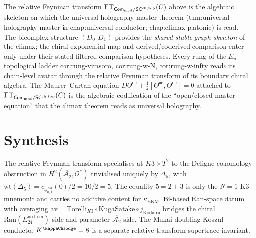 \begin{remark}%
\label{rem:anchor-relative-feynman}%
%
%
%
The relative Feynman transform $\mathrm{FT}_{\mathsf{Com}_{\mathrm{mod}} / \mathsf{SC}^{\mathrm{ch,top}}}(C)$ above is the
algebraic skeleton on which the universal-holography master
theorem (\textsf{thm:universal-holography-master} in
\textsf{chap:universal-conductor}; \textsf{chap:climax-platonic}) is
read. The bicomplex structure $(D_0, D_1)$ provides the
\emph{shared stable-graph skeleton} of the climax; the chiral
exponential map and derived/coderived comparison enter only under
their stated filtered comparison hypotheses. Every rung of the
$E_n$-topological ladder
\textsf{cor:rung-virasoro}, \textsf{cor:rung-w-N},
\textsf{cor:rung-w-infty} reads its chain-level avatar through the
relative Feynman transform of its boundary chiral algebra. The
Maurer--Cartan equation
$D \Theta^{\mathrm{oc}} + \tfrac12 [\Theta^{\mathrm{oc}},
 \Theta^{\mathrm{oc}}] = 0$
attached to $\mathrm{FT}_{\mathsf{Com}_{\mathrm{mod}} / \mathsf{SC}^{\mathrm{ch,top}}}(C)$ is the algebraic codification of the
``open/closed master equation'' that the climax theorem reads as
universal holography.
\end{remark}

\section{Synthesis}
\label{sec:rft-supplement}

\begin{remark}
\label{rem:rft-K3-paramodular}
The relative Feynman transform specialises at $K3 \times T^2$ to the Deligne-cohomology obstruction in $H^2(\overline{\mathcal{A}_2}, \mathcal{O}^*)$ trivialised uniquely by $\Delta_5$, with $\mathrm{wt}(\Delta_5)=c_{\phi_{0,1}^{K3}}(0)/2=10/2=5$. The equality $5=2+3$ is only the $N=1$ K3 mnemonic and carries no additive content for $\kappa_{\mathrm{BKM}}$. Bi-based Ran-space datum with averaging $\mathrm{av} = \mathrm{Torelli}_{K3} \circ \mathrm{KugaSatake} \circ j_{\mathrm{Kodaira}}$ bridges the chiral $\mathrm{Ran}(E^{\mathrm{nod,sm}}_{24})$ side and parameter $\overline{\mathcal{A}_2}$ side. The Mukai-doubling Koszul conductor $K^{\kappaChHodge} = 8$ is a separate relative-transform supertrace invariant.
\end{remark}
